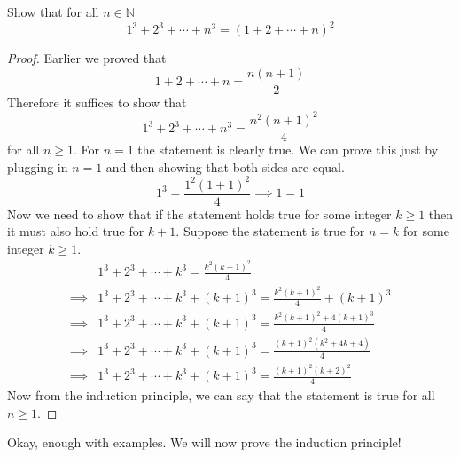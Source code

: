 \documentclass[11pt,numbers=noenddot,svgnames,dvipsnames]{scrartcl}
\begin{document}
\begin{example}
    Show that for all $n \in \mathbb{N}$
    \[
        1^{3} + 2^{3} + \cdots + n^{3} = (1 + 2 + \cdots + n)^{2}
    \]
\end{example}
\begin{proof}
    Earlier we proved that 
    \[
        1 + 2 + \cdots + n = \frac{n(n + 1)}{2}
    \]
    Therefore it suffices to show that 
    \[
        1^{3} + 2^{3} +  \cdots + n^{3} = \frac{n^{2}(n+1)^{2}}{4}
    \]
    for all $n \geq 1$. For $n=1$ the statement is clearly true. We can prove this just by plugging in $n = 1$ and 
    then showing that both sides are equal.
    \[
        1^{3} = \frac{1^{2}(1 + 1)^{2}}{4} \implies 1 = 1
    \]
    Now we need to show that if the statement holds true for some integer $k\geq 1$ then it must also hold true for $k + 1$. 
    Suppose the statement is true for $n = k$ for some integer $k\geq 1$.
    \begin{align*}
                 & 1^{3} + 2^{3} + \cdots + k^{3} = \frac{k^{2}(k + 1)^{2}}{4} \\
        \implies & 1^{3} + 2^{3} + \cdots + k^{3} + (k + 1)^{3} = \frac{k^{2}(k + 1)^{2}}{4} + (k + 1)^{3} \\
        \implies & 1^{3} + 2^{3} + \cdots + k^{3} + (k + 1)^{3} = \frac{k^{2}(k + 1)^{2} + 4(k + 1)^{3}}{4} \\
        \implies & 1^{3} + 2^{3} + \cdots + k^{3} + (k + 1)^{3} = \frac{(k + 1)^{2}(k^{2} + 4k + 4)}{4} \\
        \implies & 1^{3} + 2^{3} + \cdots + k^{3} + (k + 1)^{3} = \frac{(k + 1)^{2}(k + 2)^{2}}{4}
    \end{align*}
    Now from the induction principle, we can say that the statement is true for all $n \geq 1$.
\end{proof}

Okay, enough with examples. We will now prove the induction principle!
\end{document}
